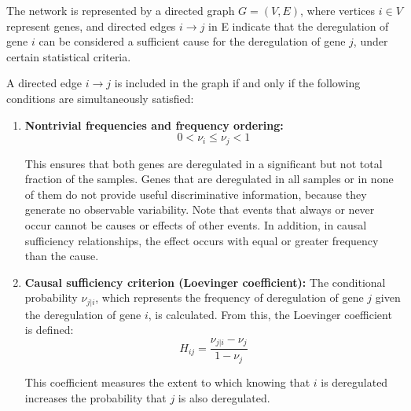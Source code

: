 \documentclass[12pt,a4paper]{report}
\begin{document}
The network is represented by a directed graph \( G = (V, E) \), where vertices \( i \in V \) represent genes, and directed edges \(  i \to j \) in E indicate that the deregulation of gene \( i \) can be considered a sufficient cause for the deregulation of gene \( j \), under certain statistical criteria.
  
A directed edge \( i \to j \) is included in the graph if and only if the following conditions are simultaneously satisfied:

\begin{enumerate}
    \item \textbf{Nontrivial frequencies and frequency ordering:}
    \begin{equation}
    \label{eq:frec}
     0 < \nu_i \leq \nu_j < 1
    \end{equation}
   
    This ensures that both genes are deregulated in a significant but not total fraction of the samples. Genes that are deregulated in all samples or in none of them do not provide useful discriminative information, because they generate no observable variability. Note that events that always or never occur cannot be causes or effects of other events. In addition, in causal sufficiency relationships, the effect occurs with equal or greater frequency than the cause. 

    \item \textbf{Causal sufficiency criterion (Loevinger coefficient):}  
    The conditional probability \( \nu_{j|i} \), which represents the frequency of deregulation of gene \( j \) given the deregulation of gene \( i \), is calculated. From this, the Loevinger coefficient is defined\cite{loevinger}:
\begin{equation}
\label{eq:hij}
 H_{ij} = \frac{\nu_{j|i} - \nu_j}{1 - \nu_j}
\end{equation}    

    This coefficient measures the extent to which knowing that \( i \) is deregulated increases the probability that \( j \) is also deregulated.    
  

\end{enumerate}
\end{document}

